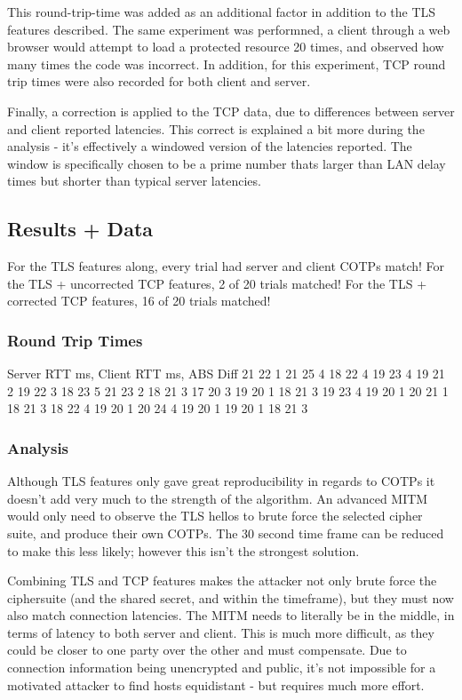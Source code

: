 \documentclass[a4paper, 11pt]{article} 				%
\begin{document}
This round-trip-time was added as an additional factor in addition to the TLS features described. The same experiment was performned, a client through a web browser would attempt to load a protected resource 20 times, and observed how many times the code was incorrect. In addition, for this experiment, TCP round trip times were also recorded for both client and server.

Finally, a correction is applied to the TCP data, due to differences between server and client reported latencies. This correct is explained a bit more during the analysis - it's effectively a windowed version of the latencies reported. The window is specifically chosen to be a prime number thats larger than LAN delay times but shorter than typical server latencies.

\subsection{Results + Data}
For the TLS features along, every trial had server and client COTPs match! 
For the TLS + uncorrected TCP features, 2 of 20 trials matched!
For the TLS + corrected TCP features, 16 of 20 trials matched!

\subsubsection{Round Trip Times}
Server RTT ms, Client RTT ms, ABS Diff
21	22	1
21	25	4
18	22	4
19	23	4
19	21	2
19	22	3
18	23	5
21	23	2
18	21	3
17	20	3
19	20	1
18	21	3
19	23	4
19	20	1
20	21	1
18	21	3
18	22	4
19	20	1
20	24	4
19	20	1
19	20	1
18	21	3


\subsubsection{Analysis}
Although TLS features only gave great reproducibility in regards to COTPs it doesn't add very much to the strength of the algorithm. An advanced MITM would only need to observe the TLS hellos to brute force the selected cipher suite, and produce their own COTPs. The 30 second time frame can be reduced to make this less likely; however this isn't the strongest solution.

Combining TLS and TCP features makes the attacker not only brute force the ciphersuite (and the shared secret, and within the timeframe), but they must now also match connection latencies. The MITM needs to literally be in the middle, in terms of latency to both server and client. This is much more difficult, as they could be closer to one party over the other and must compensate. Due to connection information being unencrypted and public, it's not impossible for a motivated attacker to find hosts equidistant - but requires much more effort.
\end{document}
